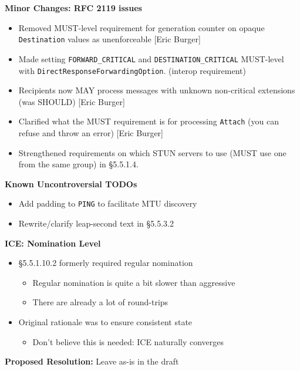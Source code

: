 \documentclass[helvetica]{seminar}
\newcommand{\heading}[1]{%
  \begin{center} 
    \large\bf 
    #1 
  \end{center} 
  \vspace{.4 in}}
\begin{document}
\begin{slide}
\heading{Minor Changes: RFC 2119 issues}

\begin{itemize}
\item Removed MUST-level requirement for generation counter on
  opaque \verb^Destination^ values as unenforceable [Eric Burger]
\item Made setting \verb^FORWARD_CRITICAL^ and \verb^DESTINATION_CRITICAL^
  MUST-level with \verb^DirectResponseForwardingOption^. (interop
  requirement)
\item Recipients now MAY process messages with unknown
  non-critical extensions (was SHOULD) [Eric Burger]
\item Clarified what the MUST requirement is for processing \verb^Attach^
  (you can refuse and throw an error) [Eric Burger]
\item Strengthened requirements on which STUN servers to use
  (MUST use one from the same group) in \S 5.5.1.4.
\end{itemize}
\end{slide}



\begin{slide}
\heading{Known Uncontroversial TODOs}

\begin{itemize}
\item Add padding to \verb^PING^ to facilitate MTU discovery
\item Rewrite/clarify leap-second text in \S 5.5.3.2
\end{itemize}
\end{slide}


\begin{slide}
\heading{ICE: Nomination Level}

\begin{itemize}
\item \S 5.5.1.10.2 formerly required regular nomination
\begin{itemize}
\item Regular nomination is quite a bit slower than aggressive
\item There are already a lot of round-trips
\end{itemize}
\item Original rationale was to ensure consistent state
\begin{itemize}
\item Don't believe this is needed: ICE naturally converges
\end{itemize}
\end{itemize}
\vspace{1em}
\textbf{Proposed Resolution:} Leave as-is in the draft
\end{slide}
\end{document}

